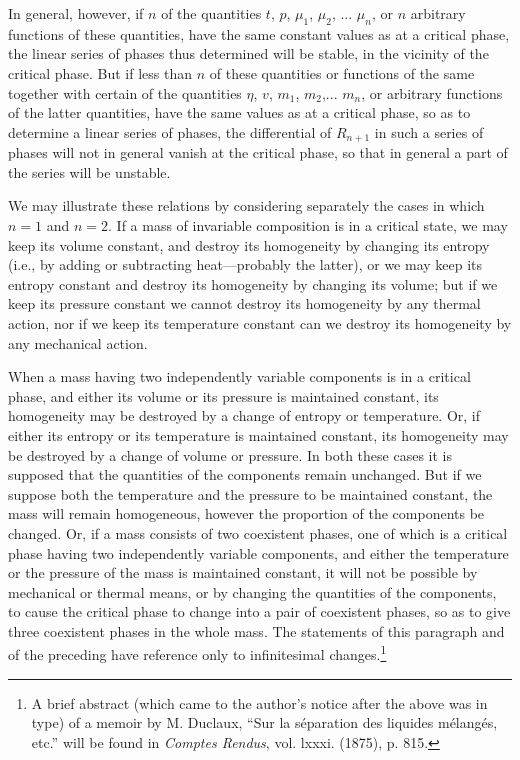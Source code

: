 \documentclass[12pt]{article}
\begin{document}
In general, however, if $n$ of the quantities $t$, $p$, $\mu_1$, $\mu_2$, ... $\mu_n$, or $n$ arbitrary functions of these quantities, have the same constant values as at a critical phase, the linear series of phases thus determined will be stable, in the vicinity of the critical phase. But if less than $n$ of these quantities or functions of the same together with certain of the quantities $\eta$, $v$, $m_1$, $m_2$,... $m_n$, or arbitrary functions of the latter quantities, have the same values as at a critical phase, so as to determine a linear series of phases, the differential of $R_{n+1}$ in such a series of phases will not in general vanish at the critical phase, so that in general a part of the series will be unstable.


We may illustrate these relations by considering separately the cases in which $n = 1$ and $n = 2$. If a mass of invariable composition is in a critical state, we may keep its volume constant, and destroy its homogeneity by changing its entropy (i.e., by adding or subtracting heat---probably the latter), or we may keep its entropy constant and destroy its homogeneity by changing its volume; but if we keep its pressure constant we cannot destroy its homogeneity by any thermal action, nor if we keep its temperature constant can we destroy its homogeneity by any mechanical action.


When a mass having two independently variable components is in a critical phase, and either its volume or its pressure is maintained constant, its homogeneity may be destroyed by a change of entropy or temperature. Or, if either its entropy or its temperature is maintained constant, its homogeneity may be destroyed by a change of volume or pressure. In both these cases it is supposed that the quantities of the components remain unchanged. But if we suppose both the temperature and the pressure to be maintained constant, the mass will remain homogeneous, however the proportion of the components be changed. Or, if a mass consists of two coexistent phases, one of which is a critical phase having two independently variable components, and either the temperature or the pressure of the mass is maintained constant, it will not be possible by mechanical or thermal means, or by changing the quantities of the components, to cause the critical phase to change into a pair of coexistent phases, so as to give three coexistent phases in the whole mass. The statements of this paragraph and of the preceding have reference only to infinitesimal changes.\footnote{A brief abstract (which came to the author's notice after the above was in type) of a memoir by M. Duclaux,  ``Sur la séparation des liquides mélangés, etc.'' will be found in \textit{Comptes Rendus}, vol. lxxxi. (1875), p. 815.}
\end{document}
